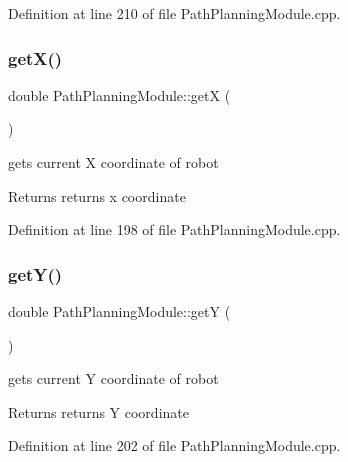 Definition at line 210 of file Path\+Planning\+Module.\+cpp.

\mbox{\label{class_path_planning_module_ad53f67a8e9e760a394b78e9a5ae53b21}} 
\subsubsection{\texorpdfstring{get\+X()}{getX()}}
{\footnotesize\ttfamily double Path\+Planning\+Module\+::getX (\begin{DoxyParamCaption}{ }\end{DoxyParamCaption})}



gets current X coordinate of robot 

\begin{DoxyReturn}{Returns}
returns x coordinate 
\end{DoxyReturn}


Definition at line 198 of file Path\+Planning\+Module.\+cpp.

\mbox{\label{class_path_planning_module_a327b34fd37c2d1b52c79eb48c8a84faf}} 
\subsubsection{\texorpdfstring{get\+Y()}{getY()}}
{\footnotesize\ttfamily double Path\+Planning\+Module\+::getY (\begin{DoxyParamCaption}{ }\end{DoxyParamCaption})}



gets current Y coordinate of robot 

\begin{DoxyReturn}{Returns}
returns Y coordinate 
\end{DoxyReturn}


Definition at line 202 of file Path\+Planning\+Module.\+cpp.

\mbox{\label{class_path_planning_module_a670b9233e62542af0b94a145b489f606}} 
